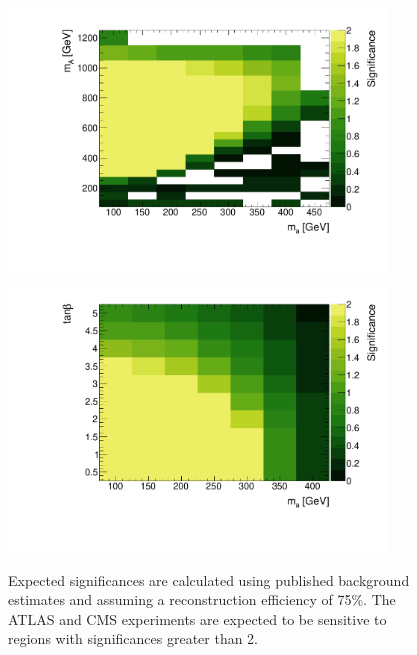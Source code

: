\begin{figure}
\centering
\includegraphics[width=0.9\textwidth]{texinputs/04_grid/figures/monoz/leptonic/mAma_Significance_ll.pdf}
\includegraphics[width=0.9\textwidth]{texinputs/04_grid/figures/monoz/leptonic/tanbma_Significance_ll.pdf}
\caption{Expected significances are calculated using published background estimates and assuming a reconstruction efficiency of 75\%.  The ATLAS and CMS experiments are expected to be sensitive to regions with significances greater than 2.}
\label{fig:expected_significance_monozll}
\end{figure}

